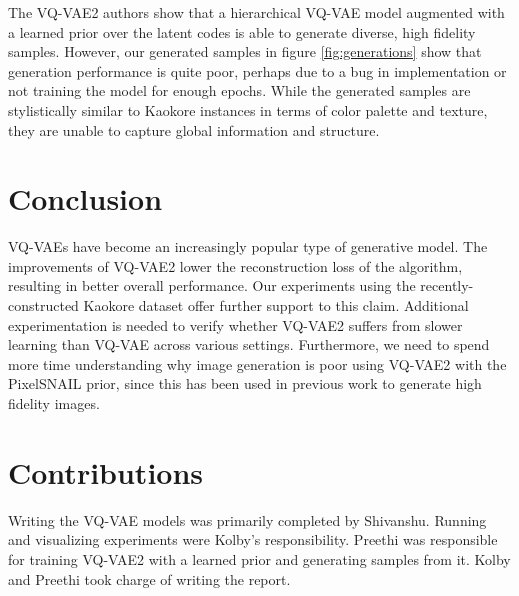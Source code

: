 \documentclass{article}
\begin{document}
The VQ-VAE2 authors show that a hierarchical VQ-VAE model augmented with a learned prior over the latent codes is able to generate diverse, high fidelity samples. However, our generated samples in figure \ref{fig:generations} show that generation performance is quite poor, perhaps due to a bug in implementation or not training the model for enough epochs. While the generated samples are stylistically similar to Kaokore instances in terms of color palette and texture, they are unable to capture global information and structure.

\section{Conclusion}

VQ-VAEs have become an increasingly popular type of generative model. The improvements of VQ-VAE2 lower the reconstruction loss of the algorithm, resulting in better overall performance. Our experiments using the recently-constructed Kaokore dataset offer further support to this claim. Additional experimentation is needed to verify whether VQ-VAE2 suffers from slower learning than VQ-VAE across various settings. Furthermore, we need to spend more time understanding why image generation is poor using VQ-VAE2 with the PixelSNAIL prior, since this has been used in previous work to generate high fidelity images. 

\section{Contributions}

Writing the VQ-VAE models was primarily completed by Shivanshu. Running and visualizing experiments were Kolby's responsibility. Preethi was responsible for training VQ-VAE2 with a learned prior and generating samples from it. Kolby and Preethi took charge of writing the report.



\end{document}
